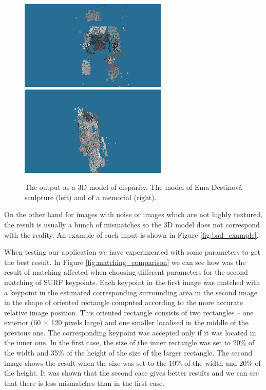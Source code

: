 \begin{figure}[h]
\centerline{
\includegraphics[width=7.0cm]{img/ema_3Dresult.png}
\includegraphics[width=7.0cm]{img/memorial_3Dresult.png}}
\caption{The output as a 3D model of disparity. The model of Ema Destinová sculpture (left) and of a memorial (right).}
\label{fig:outupt_samples}
\end{figure}

On the other hand for images with noise or images which are not highly textured, the result is usually a bunch of mismatches so the 3D model does not correspond with the reality.
An example of such input is shown in Figure \ref{fig:bad_example}.

When testing our application we have experimented with some parameters to get the best result.
In Figure \ref{fig:matching_comparison} we can see how was the result of matching affected when choosing different parameters for the second matching of SURF keypoints.
Each keypoint in the first image was matched with a keypoint in the estimated corresponding surrounding area in the second image in the shape of oriented rectangle computed according to the more accurate relative image position.
This oriented rectangle consists of two rectangles -- one exterior (60 $\times$ 120 pixels large) and one smaller localised in the middle of the previous one.
The corresponding keypoint was accepted only if it was located in the inner one.
In the first case, the size of the inner rectangle was set to 20\% of the width and 35\% of the height of the size of the larger rectangle.
The second image shows the result when the size was set to the 10\% of the width and 20\% of the height.
It was shown that the second case gives better results and we can see that there is less mismatches than in the first case.

